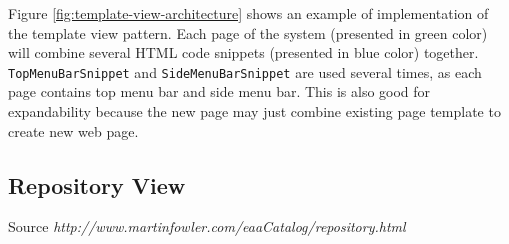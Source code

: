 Figure \ref{fig:template-view-architecture} shows an example of implementation of the template view pattern. Each page of the system (presented in green color) will combine several HTML code snippets (presented in blue color) together. \texttt{TopMenuBarSnippet} and \texttt{SideMenuBarSnippet} are used several times, as each page contains top menu bar and side menu bar. This is also good for expandability because the new page may just combine existing page template to create new web page.

\subsection{Repository View}


Source \textit{http://www.martinfowler.com/eaaCatalog/repository.html}


